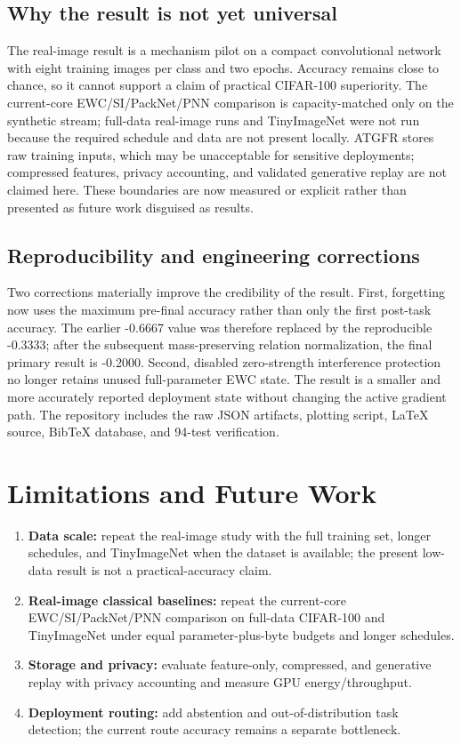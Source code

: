 \documentclass[conference]{IEEEtran}
\begin{document}
\subsection{Why the result is not yet universal}

The real-image result is a mechanism pilot on a compact convolutional network
with eight training images per class and two epochs. Accuracy remains close to
chance, so it cannot support a claim of practical CIFAR-100 superiority. The
current-core EWC/SI/PackNet/PNN comparison is capacity-matched only on the
synthetic stream; full-data real-image runs and TinyImageNet were not run
because the required schedule and data are not present locally. ATGFR stores
raw training inputs, which may be unacceptable for sensitive deployments;
compressed features, privacy accounting, and validated generative replay are
not claimed here. These boundaries are now measured or explicit rather than
presented as future work disguised as results.

\subsection{Reproducibility and engineering corrections}

Two corrections materially improve the credibility of the result. First,
forgetting now uses the maximum pre-final accuracy rather than only the first
post-task accuracy. The earlier -0.6667 value was therefore replaced by the
reproducible -0.3333; after the subsequent mass-preserving relation
normalization, the final primary result is -0.2000. Second, disabled
zero-strength interference protection
no longer retains unused full-parameter EWC state. The result is a smaller
and more accurately reported deployment state without changing the active
gradient path. The repository includes the raw JSON artifacts, plotting
script, LaTeX source, BibTeX database, and 94-test verification.

\section{Limitations and Future Work}
\label{sec:limitations}

\begin{enumerate}
\item \textbf{Data scale:} repeat the real-image study with the full
training set, longer schedules, and TinyImageNet when the dataset is
available; the present low-data result is not a practical-accuracy claim.
\item \textbf{Real-image classical baselines:} repeat the current-core
EWC/SI/PackNet/PNN comparison on full-data CIFAR-100 and TinyImageNet under
equal parameter-plus-byte budgets and longer schedules.
\item \textbf{Storage and privacy:} evaluate feature-only, compressed, and
generative replay with privacy accounting and measure GPU energy/throughput.
\item \textbf{Deployment routing:} add abstention and out-of-distribution
task detection; the current route accuracy remains a separate bottleneck.
\end{enumerate}
\end{document}
